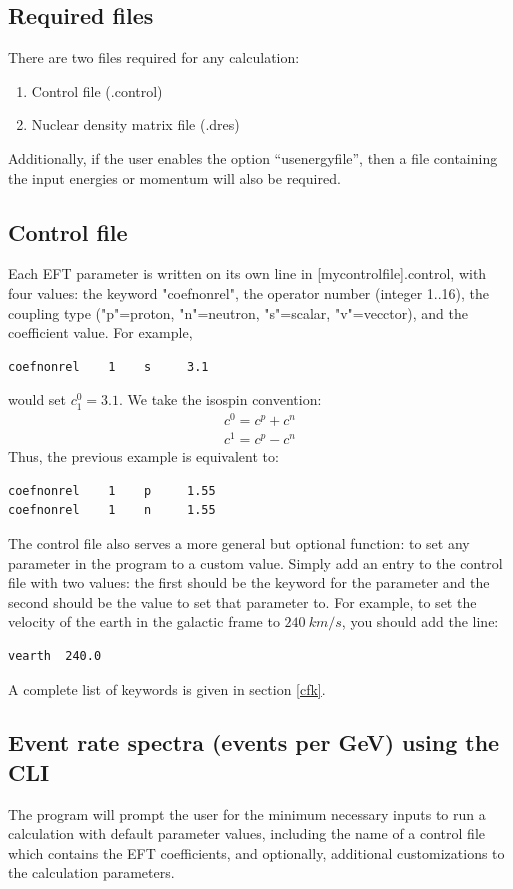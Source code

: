 \documentclass[11pt]{article}
\begin{document}
\subsection{Required files}
There are two files required for any calculation:
\begin{enumerate}
    \item Control file (.control)
    \item Nuclear density matrix file (.dres)
\end{enumerate}
Additionally, if the user enables the option ``usenergyfile'', then a file
containing the input energies or momentum will also be required.

\subsection{Control file}
Each EFT parameter is written on its own line in [mycontrolfile].control, with
four values: the keyword "coefnonrel", the operator number (integer 1..16), the
coupling type ("p"=proton, "n"=neutron, "s"=scalar, "v"=vecctor), and the
coefficient value. For example, 
\begin{verbatim}
coefnonrel    1    s     3.1
\end{verbatim}
would set $c_1^0 = 3.1$. We take the isospin convention:
\begin{equation}
	\begin{split}
		c^0 = c^p + c^n\\
		c^1 = c^p - c^n
	\end{split}
\end{equation}
Thus, the previous example is equivalent to:
\begin{verbatim}
coefnonrel    1    p     1.55
coefnonrel    1    n     1.55
\end{verbatim}

The control file also serves a more general but optional function: to set any 
parameter in the program to a custom value.  
Simply add an entry to the control file with two values: the first 
should be the keyword for the parameter and the 
second should be the value to set that parameter to. For example, to set the 
velocity of the earth in the galactic frame to $240\ km/s$, you should add the line:
\begin{verbatim}
vearth  240.0
\end{verbatim}
A complete list of keywords is given in section \ref{cfk}.

\subsection{Event rate spectra (events per GeV) using the CLI}
The program will prompt the user for 
the minimum necessary inputs to run a calculation with default parameter 
values, including the name of a control file which contains the EFT
coefficients, and optionally, additional customizations to the calculation
parameters.
\end{document}
